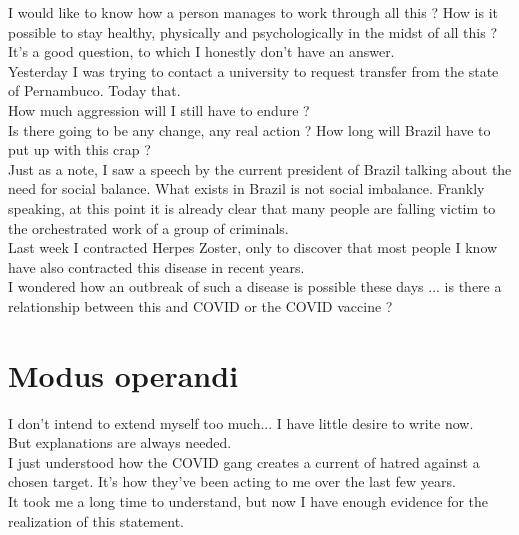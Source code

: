 \documentclass[11pt]{book}
\begin{document}
\noindent I would like to know how a person manages to work through all this ? How is it possible to stay healthy, physically and psychologically in the midst of all this ? \\

\noindent It's a good question, to which I honestly don't have an answer. \\

\noindent Yesterday I was trying to contact a university to request transfer from the state of Pernambuco. Today that. \\

\noindent How much aggression will I still have to endure ?  \\

\noindent Is there going to be any change, any real action ? How long will Brazil have to put up with this crap ? \\ 

\noindent Just as a note, I saw a speech by the current president of Brazil talking about the need for social balance. What exists in Brazil is not social imbalance. Frankly speaking, at this point it is already clear that many people are falling victim to the orchestrated work of a group of criminals. \\

\noindent Last week I contracted Herpes Zoster, only to discover that most people I know have also contracted this disease in recent years. \\

\noindent I wondered how an outbreak of such a disease is possible these days ... is there a relationship between this and COVID or the COVID vaccine ? \\

\chapter{Modus operandi}

I don't intend to extend myself too much... I have little desire to write now. \\

\noindent But explanations are always needed. \\

\noindent I just understood how the COVID gang creates a current of hatred against a chosen target. It's how they've been acting to me over the last few years. \\

\noindent It took me a long time to understand, but now I have enough evidence for the realization of this statement. \\
\end{document}

